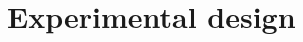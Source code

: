 \documentclass[11pt, oneside]{book}   	%
\begin{document}








 





\section{Experimental design}
\end{document}
